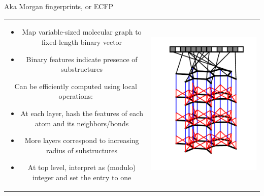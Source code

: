 \documentclass[landscape,a0b,final,a4resizeable]{include/a0poster}
\begin{document}
\begin{poster}
\begin{multicols}{3}

Aka Morgan fingerprints, or ECFP

\begin{tabular}{cc}
\begin{minipage}[c]{0.5\columnwidth}
\begin{itemize}
  \item Map variable-sized molecular graph to fixed-length binary vector
  \item Binary features indicate presence of substructures
\end{itemize}

Can be efficiently computed using local operations:

\begin{itemize}
  \item At each layer, hash the features of each atom and its neighbors/bonds
  \item More layers correspond to increasing radius of substructures
  \item At top level, interpret as (modulo) integer and set the entry to one
\end{itemize}
\end{minipage} & 
\begin{minipage}[c]{0.5\columnwidth}
\centerline{\includegraphics[width=0.9\columnwidth, clip, trim=4mm 12mm 4mm 4mm]{figures/fig_1}}
\end{minipage}
\end{tabular}




\end{multicols}
\end{poster}
\end{document}
